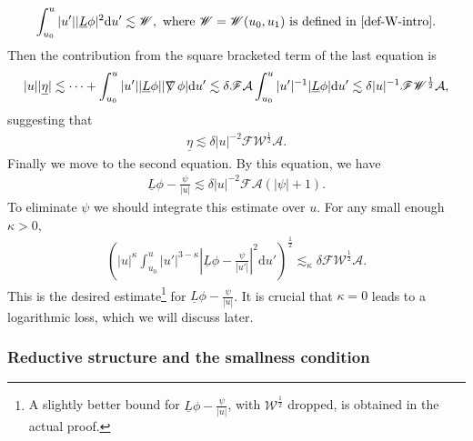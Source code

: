 \documentclass[11pt,reqno]{amsart}
\theoremstyle{definition}
\numberwithin{equation}{section}
\newcommand{\D}{\mathrm{d}}
\def\etab{\underline{\eta}}
\def\Lb{\underline{L}}
\def\nablas{\mbox{$\nabla \mkern -13mu /$ }}
\begin{document}
\begin{align*}
\int_{u_0}^u|u'||\Lb\phi|^2\D u'\lesssim\mathscr{W},\ \text{where $\mathscr{W}=\mathscr{W}(u_0,u_1)$ is defined in \eqref{def-W-intro}}.
\end{align*}
Then the contribution from the square bracketed term of the last equation is
\begin{align*}
|u||\etab|\lesssim\cdots+\int_{u_0}^u|u'||\Lb\phi||\nablas\phi|\D u'\lesssim\delta\mathscr{F}\mathcal{A}\int_{u_0}^u|u'|^{-1}|\Lb\phi|\D u'\lesssim\delta|u|^{-1}\mathscr{F}\mathscr{W}^{\frac{1}{2}}\mathcal{A},
\end{align*}
suggesting that
\begin{align}\label{estimate-etab-intro}
\etab\lesssim\delta|u|^{-2}\mathscr{F}\mathscr{W}^{\frac{1}{2}}\mathcal{A}.
\end{align}
Finally we move to the second equation. By this equation, we have
\begin{align*}
\Lb\phi-\frac{\psi}{|u|}\lesssim\delta|u|^{-2}\mathscr{F}\mathcal{A}(|\psi|+1).
\end{align*}
To eliminate $\psi$ we should integrate this estimate over $u$. For any small enough $\kappa>0$, 
\begin{align}\label{estimate-Lbphi-intro}
\left(|u|^\kappa\int_{u_0}^u|u'|^{3-\kappa}\left|\Lb\phi-\frac{\psi}{|u'|}\right|^2\D u'\right)^{\frac{1}{2}}\lesssim_\kappa\delta\mathscr{F}\mathscr{W}^{\frac{1}{2}}\mathcal{A}.
\end{align}
This is the desired estimate\footnote{A slightly better bound for $\Lb\phi-\frac{\psi}{|u|}$, with $\mathscr{W}^{\frac{1}{2}}$ dropped, is obtained in the actual proof.} for $\Lb\phi-\frac{\psi}{|u|}$. It is crucial that $\kappa=0$ leads to a logarithmic loss, which we will discuss later. 

\subsubsection{Reductive structure and the smallness condition}
\end{document}

